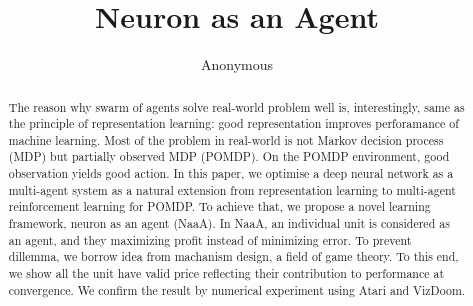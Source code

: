 \documentclass{article} %
\title{Neuron as an Agent}
\author{Anonymous}
\begin{document}
\maketitle

\begin{abstract}
The reason why swarm of agents solve real-world problem well is, interestingly,
same as the principle of representation learning: good representation improves
perforamance of machine learning. Most of the problem in real-world is not
Markov decision process (MDP) but partially observed MDP (POMDP). On the
POMDP environment, good observation yields good action. In this paper, we
optimise a deep neural network as a multi-agent system as a natural extension
from representation learning to multi-agent reinforcement learning for POMDP.
To achieve that, we propose a novel learning framework, neuron as an agent
(NaaA). In NaaA, an individual unit is considered as an agent, and they maximizing
profit instead of minimizing error. To prevent dillemma, we borrow idea
from machanism design, a field of game theory. To this end, we show all the unit
have valid price reflecting their contribution to performance at convergence. We
confirm the result by numerical experiment using Atari and VizDoom.
\end{abstract}












\end{document}
